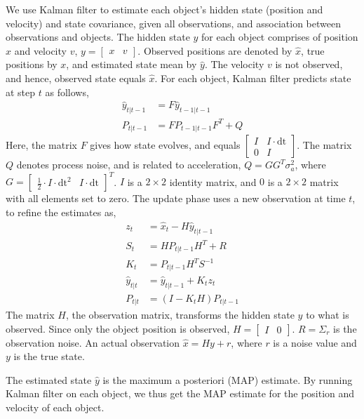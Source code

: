 \documentclass[a4paper]{article}
\newcommand{\x}{\hat{x}}
\newcommand{\y}{\hat{y}}
\newcommand{\dt}{\text{dt}}
\begin{document}
We use Kalman filter to estimate each object's hidden state (position and velocity)
and state covariance, given all observations, and association between observations
and objects.
The hidden state $y$ for each object comprises of position $x$ and velocity $v$,
$y = \begin{bmatrix} x & v \end{bmatrix}$.
Observed positions are denoted by $\x$, true positions by $x$, and estimated
state mean by $\y$.
The velocity $v$ is not observed, and hence, observed state equals $\x$.
For each object, Kalman filter predicts state at step $t$ as follows,
\begin{align*}
\y_{t|t-1} &= F \y_{t-1|t-1} \\
P_{t|t-1}  &= F P_{t-1|t-1} F^T + Q
\end{align*}
Here, the matrix $F$ gives how state evolves, and equals
$\begin{bmatrix} I & I \cdot \dt \\ 0 & I \end{bmatrix}$.
The matrix $Q$ denotes process noise, and is related to acceleration,
$Q = G G^T \sigma_a^2$, where
$G = \begin{bmatrix} \frac{1}{2} \cdot I \cdot \dt^2 & I \cdot \dt \end{bmatrix} ^T$.
$I$ is a $2 \times 2$ identity matrix, and $0$ is a $2 \times 2$ matrix
with all elements set to zero.
The update phase uses a new observation at time $t$, to refine the estimates as,
\begin{align*}
z_t        &= \x_t - H \y_{t|t-1} \\
S_t        &= H P_{t|t-1} H^T + R \\
K_t        &= P_{t|t-1} H^T S^{-1} \\
\y_{t|t}   &= \y_{t|t-1} + K_t z_t \\
P_{t|t}    &= (I - K_t H) P_{t|t-1}
\end{align*}
The matrix $H$, the observation matrix, transforms the hidden state $y$ to what is observed.
Since only the object position is observed, $H = \begin{bmatrix} I & 0 \end{bmatrix}$.
$R = \Sigma_r$ is the observation noise.
An actual observation $\x = H y + r$, where $r$ is a noise value and $y$ is the true state.

The estimated state $\y$ is the maximum a posteriori (MAP) estimate.
By running Kalman filter on each object, we thus get the MAP estimate for the position
and velocity of each object.
\end{document}
